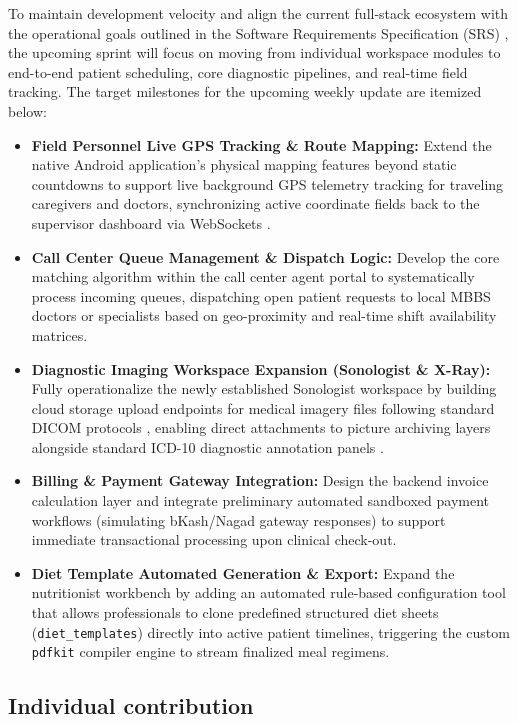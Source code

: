 \documentclass[onecolumn,journal]{IEEEtran}
\begin{document}
	To maintain development velocity and align the current full-stack ecosystem with the operational goals outlined in the Software Requirements Specification (SRS) \cite{srs2026}, the upcoming sprint will focus on moving from individual workspace modules to end-to-end patient scheduling, core diagnostic pipelines, and real-time field tracking. The target milestones for the upcoming weekly update are itemized below:
	
	\begin{itemize}
		\item \textbf{Field Personnel Live GPS Tracking \& Route Mapping:} Extend the native Android application's physical mapping features beyond static countdowns to support live background GPS telemetry tracking \cite{zandbergen2009accuracy} for traveling caregivers and doctors, synchronizing active coordinate fields back to the supervisor dashboard via WebSockets \cite{fette2011websocket}.
		\item \textbf{Call Center Queue Management \& Dispatch Logic:} Develop the core matching algorithm within the call center agent portal to systematically process incoming queues, dispatching open patient requests to local MBBS doctors or specialists based on geo-proximity and real-time shift availability matrices.
		\item \textbf{Diagnostic Imaging Workspace Expansion (Sonologist \& X-Ray):} Fully operationalize the newly established Sonologist workspace by building cloud storage upload endpoints for medical imagery files following standard DICOM protocols \cite{dicom2021}, enabling direct attachments to picture archiving layers \cite{pacs2001} alongside standard ICD-10 diagnostic annotation panels \cite{who2016icd10}.
		\item \textbf{Billing \& Payment Gateway Integration:} Design the backend invoice calculation layer and integrate preliminary automated sandboxed payment workflows (simulating bKash/Nagad gateway responses) to support immediate transactional processing upon clinical check-out.
		\item \textbf{Diet Template Automated Generation \& Export:} Expand the nutritionist workbench by adding an automated rule-based configuration tool that allows professionals to clone predefined structured diet sheets (\texttt{diet\_templates}) directly into active patient timelines, triggering the custom \texttt{pdfkit} compiler engine to stream finalized meal regimens.
	\end{itemize}
	
	\subsection{Individual contribution}
	
\end{document}
